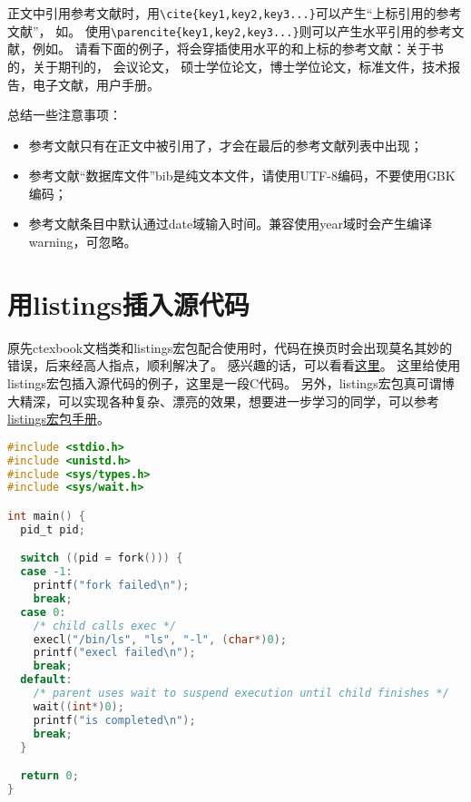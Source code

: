 正文中引用参考文献时，用\verb+\cite{key1,key2,key3...}+可以产生“上标引用的参考文献”，
如\cite{Meta_CN,chen2007act,DPMG}。
使用\verb+\parencite{key1,key2,key3...}+则可以产生水平引用的参考文献，例如\parencite{JohnD,zhubajie,IEEE-1363}。
请看下面的例子，将会穿插使用水平的和上标的参考文献：关于书的\parencite{Meta_CN,JohnD,IEEE-1363}，关于期刊的\cite{chen2007act,chen2007ewi}，
会议论文\parencite{DPMG,kocher99,cnproceed}，
硕士学位论文\parencite{zhubajie,metamori2004}，博士学位论文\cite{shaheshang,FistSystem01,bai2008}，标准文件\parencite{IEEE-1363}，技术报告\cite{NPB2}，电子文献\parencite{xiaoyu2001, CHRISTINE1998}，用户手册\parencite{RManual}。

总结一些注意事项：
\begin{itemize}
\item 参考文献只有在正文中被引用了，才会在最后的参考文献列表中出现；
\item 参考文献“数据库文件”bib是纯文本文件，请使用UTF-8编码，不要使用GBK编码；
\item 参考文献条目中默认通过date域输入时间。兼容使用year域时会产生编译warning，可忽略。
\end{itemize}

\section{用listings插入源代码}

原先ctexbook文档类和listings宏包配合使用时，代码在换页时会出现莫名其妙的错误，后来经高人指点，顺利解决了。
感兴趣的话，可以看看\href{http://bbs.ctex.org/viewthread.php?tid=53451}{这里}。
这里给使用listings宏包插入源代码的例子，这里是一段C代码。
另外，listings宏包真可谓博大精深，可以实现各种复杂、漂亮的效果，想要进一步学习的同学，可以参考
\href{http://mirror.ctan.org/macros/latex/contrib/listings/listings.pdf}{listings宏包手册}。

\begin{lstlisting}[language={C}, caption={一段C源代码}]
#include <stdio.h>
#include <unistd.h>
#include <sys/types.h>
#include <sys/wait.h>

int main() {
  pid_t pid;

  switch ((pid = fork())) {
  case -1:
    printf("fork failed\n");
    break;
  case 0:
    /* child calls exec */
    execl("/bin/ls", "ls", "-l", (char*)0);
    printf("execl failed\n");
    break;
  default:
    /* parent uses wait to suspend execution until child finishes */
    wait((int*)0);
    printf("is completed\n");
    break;
  }

  return 0;
}
\end{lstlisting}


